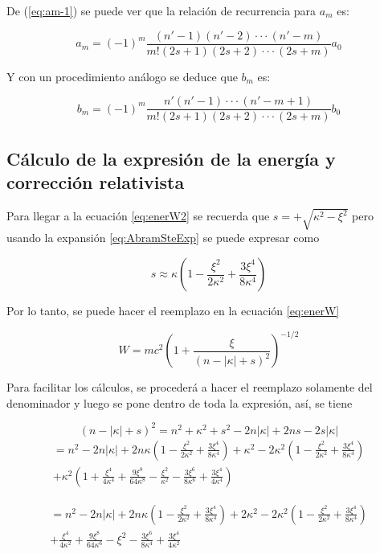 \documentclass[a4paper, 12pt]{article} %
\begin{document}
De (\ref{eq:am-1}) se puede ver que la relaci\'on de recurrencia para $a_m$ es:

\begin{equation}
a_m = (-1)^m \dfrac{(n'-1)(n'-2)\cdot\cdot\cdot(n'-m)}{m!(2s+1)(2s+2)\cdot\cdot\cdot(2s+m)}a_0
\end{equation} 

Y con un procedimiento an\'alogo se deduce que $b_m$ es:
 
\begin{equation}
b_m = (-1)^m \dfrac{n'(n'-1)\cdot\cdot\cdot (n'-m +1)}{m!(2s+1)(2s+2)\cdot\cdot\cdot(2s+m)}b_0
\end{equation}

\subsection{C\'alculo de la expresi\'on de la energ\'ia y correcci\'on relativista}

Para llegar a la ecuaci\'on \ref{eq:enerW2} se recuerda que $s=+\sqrt{\kappa^2-\xi^2}$ pero usando la expansi\'on \ref{eq:AbramSteExp} se puede expresar como 

\begin{equation}
s\approx \kappa \left( 1-\frac{\xi^2}{2\kappa^2}+\frac{3\xi^4}{8\kappa^4}  \right)
\end{equation}

Por lo tanto, se puede hacer el reemplazo en la ecuaci\'on \ref{eq:enerW}

\begin{equation}
W = mc^2 \left(1+\dfrac{\xi}{(n-|\kappa|+s)^2} \right)^{-1/2}
\end{equation}

Para facilitar los c\'alculos, se proceder\'a a hacer el reemplazo solamente del denominador y luego se pone dentro de toda la expresi\'on, as\'i, se tiene

\[
(n-|\kappa| + s)^2 = n^2 + \kappa^2 + s^2 -2n|\kappa| +2ns -2s|\kappa| 
\]
\[
\begin{split}
= n^2-2n|\kappa|+2n\kappa \left( 1-\frac{\xi^2}{2\kappa^2} +\frac{3\xi^4}{8\kappa^4} \right) +\kappa^2 -2\kappa^2 \left( 1-\frac{\xi^2}{2\kappa^2} +\frac{3\xi^4}{8\kappa^4} \right) \\
+ \kappa^2 \left(  1+\frac{\xi^4}{4\kappa^4} +\frac{9\xi^8}{64\kappa^8} -\frac{\xi^2}{\kappa^2} -\frac{3\xi^6}{8\kappa^6} + \frac{3\xi^4}{4\kappa^4} \right)
\end{split}
\]

\[
\begin{split}
=n^2-2n|\kappa| +2n\kappa \left( 1-\frac{\xi^2}{2\kappa^2} +\frac{3\xi^4}{8\kappa^4} \right) +2\kappa^2 -2\kappa^2 \left( 1-\frac{\xi^2}{2\kappa^2} +\frac{3\xi^4}{8\kappa^4} \right) \\
+\frac{\xi^4}{4\kappa^2} +\frac{9\xi^8}{64\kappa^6} -\xi^2 -\frac{3\xi^6}{8\kappa^4} + \frac{3\xi^4}{4\kappa^2}
\end{split}
\]
\end{document}
